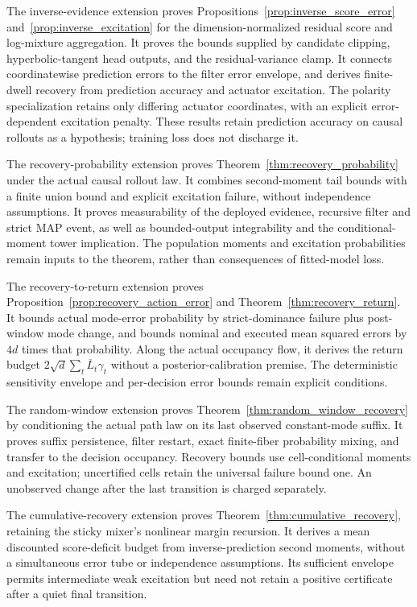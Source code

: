 The inverse-evidence extension proves Propositions~\ref{prop:inverse_score_error} and~\ref{prop:inverse_excitation} for the dimension-normalized residual score and log-mixture aggregation.
It proves the bounds supplied by candidate clipping, hyperbolic-tangent head outputs, and the residual-variance clamp.
It connects coordinatewise prediction errors to the filter error envelope, and derives finite-dwell recovery from prediction accuracy and actuator excitation.
The polarity specialization retains only differing actuator coordinates, with an explicit error-dependent excitation penalty.
These results retain prediction accuracy on causal rollouts as a hypothesis; training loss does not discharge it.

The recovery-probability extension proves Theorem~\ref{thm:recovery_probability} under the actual causal rollout law.
It combines second-moment tail bounds with a finite union bound and explicit excitation failure, without independence assumptions.
It proves measurability of the deployed evidence, recursive filter and strict MAP event, as well as bounded-output integrability and the conditional-moment tower implication.
The population moments and excitation probabilities remain inputs to the theorem, rather than consequences of fitted-model loss.

The recovery-to-return extension proves Proposition~\ref{prop:recovery_action_error} and Theorem~\ref{thm:recovery_return}.
It bounds actual mode-error probability by strict-dominance failure plus post-window mode change, and bounds nominal and executed mean squared errors by $4d$ times that probability.
Along the actual occupancy flow, it derives the return budget $2\sqrt d\sum_t\overline L_t\gamma_t$ without a posterior-calibration premise.
The deterministic sensitivity envelope and per-decision error bounds remain explicit conditions.

The random-window extension proves Theorem~\ref{thm:random_window_recovery} by conditioning the actual path law on its last observed constant-mode suffix.
It proves suffix persistence, filter restart, exact finite-fiber probability mixing, and transfer to the decision occupancy.
Recovery bounds use cell-conditional moments and excitation; uncertified cells retain the universal failure bound one.
An unobserved change after the last transition is charged separately.

The cumulative-recovery extension proves Theorem~\ref{thm:cumulative_recovery}, retaining the sticky mixer's nonlinear margin recursion.
It derives a mean discounted score-deficit budget from inverse-prediction second moments, without a simultaneous error tube or independence assumptions.
Its sufficient envelope permits intermediate weak excitation but need not retain a positive certificate after a quiet final transition.

